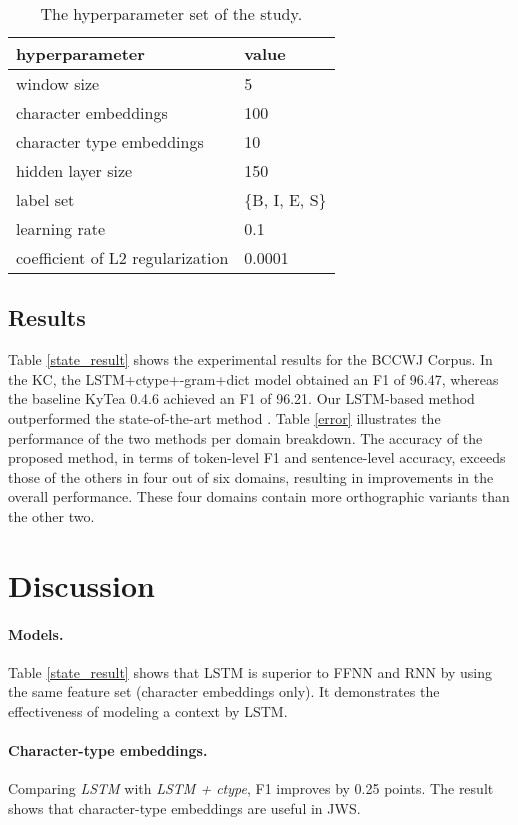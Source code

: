\documentclass[11pt]{article}
\begin{document}
\begin{table}[t]
\caption{The hyperparameter set of the study.}
\label{parameter}
\centering
 \begin{tabular}{ll}
    \toprule
    hyperparameter            & value \\
    \midrule
    window size                & 5  \\
    character embeddings       & 100\\
    character type embeddings  & 10 \\
    hidden layer size          & 150\\
    label set                  & \{B, I, E, S\} \\
    learning rate              & 0.1\\
    coefficient of L2 regularization & 0.0001\\
   \bottomrule
\end{tabular}
\end{table}
 
                  
\subsection{Results}
Table \ref{state_result} shows the experimental results for the BCCWJ Corpus.
In the KC, the LSTM+ctype+-gram+dict model obtained
an F1 of 96.47, whereas the baseline KyTea 0.4.6 achieved an F1 of 96.21.
Our LSTM-based method outperformed the state-of-the-art method
\cite{neubig-nakata-mori:2011:ACL-HLT2011}. Table \ref{error} illustrates the
performance of the two methods per domain breakdown. The accuracy of the
proposed method, in terms of token-level F1 and sentence-level accuracy,
exceeds those of the others in four out of six domains, resulting in
improvements in the overall performance.  These four domains contain more
orthographic variants than the other two.


\section{Discussion}
\paragraph{Models.}
Table \ref{state_result} shows that LSTM is superior to FFNN and RNN by using
the same feature set (character embeddings only). It demonstrates the
effectiveness of modeling a context by LSTM.

\paragraph{Character-type embeddings.} Comparing {\it LSTM} with {\it LSTM +
ctype}, F1 improves by 0.25 points. The result shows that character-type
embeddings are useful in JWS.
\end{document}
